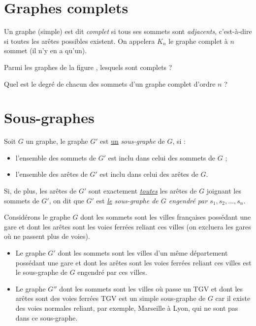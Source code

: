 \documentclass[french]{book}
\begin{document}
\section{Graphes complets}

\begin{defn} Un graphe (simple) est dit \emph{complet} si tous ses sommets sont \emph{adjacents}, c'est-à-dire si toutes les arêtes possibles existent. On appelera $K_n$ le graphe complet à $n$ sommet (il n'y en a qu'un). \end{defn}

\begin{exo*}
Parmi les graphes de la figure , lesquels sont complets ?
\end{exo*}

\begin{exo*}
Quel est le degré de chacun des sommets d'un graphe complet d'ordre $n$ ?
\end{exo*}

\section{Sous-graphes}

\begin{defn}
Soit $G$ un graphe, le graphe $G'$ est \underline{un} \emph{sous-graphe} de $G$, si :
\begin{itemize}
	\item l'ensemble des sommets de $G'$ est inclu dans celui des sommets de $G$ ;
	\item l'ensemble des arêtes de $G'$ est inclu dans celui des arêtes de $G$.
\end{itemize}
Si, de plus, les arêtes de $G'$ sont exactement \emph{\underline{toutes}} les arêtes de $G$ joignant les sommets de $G'$, on dit que $G'$ est \emph{\underline{le} sous-graphe de $G$ engendré par $s_1, s_2, \dots , s_n$}.
\end{defn}

\begin{exemple} Considérons le graphe $G$ dont les sommets sont les villes françaises possédant une gare et dont les arêtes sont les voies ferrées reliant ces villes (on excluera les gares où ne passent plus de voies).
\begin{itemize}
	\item Le graphe $G'$ dont les sommets sont les villes d'un même département possédant une gare et dont les arêtes sont les voies ferrées reliant ces villes est le sous-graphe de $G$ engendré par ces villes.
	\item Le graphe $G''$ dont les sommets sont les villes où passe un TGV et dont les arêtes sont des voies ferrées TGV est un simple sous-graphe de $G$ car il existe des voies normales reliant, par exemple, Marseille à Lyon, qui ne sont pas dans ce sous-graphe.
\end{itemize}
\end{exemple}
\end{document}
